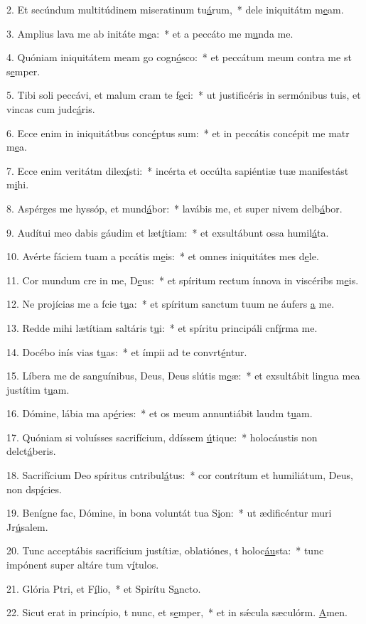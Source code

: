 2. Et secúndum multitúdinem miseratinum tu\uline{á}rum,~* dele iniquitátm m\uline{e}am.\par 
3. Amplius lava me ab initáte m\uline{e}a:~* et a peccáto me m\uline{u}nda me.\par 
4. Quóniam iniquitátem meam go cogn\uline{ó}sco:~* et peccátum meum contra me st s\uline{e}mper.\par 
5. Tibi soli peccávi, et malum cram te f\uline{e}ci:~* ut justificéris in sermónibus tuis, et vincas cum judc\uline{á}ris.\par 
6. Ecce enim in iniquitátbus conc\uline{é}ptus sum:~* et in peccátis concépit me matr m\uline{e}a.\par 
7. Ecce enim veritátm dilex\uline{í}sti:~* incérta et occúlta sapiéntiæ tuæ manifestást m\uline{i}hi.\par 
8. Aspérges me hyssóp, et mund\uline{á}bor:~* lavábis me, et super nivem delb\uline{á}bor.\par 
9. Audítui meo dabis gáudim et læt\uline{í}tiam:~* et exsultábunt ossa humil\uline{á}ta.\par 
10. Avérte fáciem tuam a pccátis m\uline{e}is:~* et omnes iniquitátes mes d\uline{e}le.\par 
11. Cor mundum cre in me, D\uline{e}us:~* et spíritum rectum ínnova in viscéribs m\uline{e}is.\par 
12. Ne projícias me a fcie t\uline{u}a:~* et spíritum sanctum tuum ne áufers \uline{a} me.\par 
13. Redde mihi lætítiam saltáris t\uline{u}i:~* et spíritu principáli cnf\uline{í}rma me.\par 
14. Docébo inís vias t\uline{u}as:~* et ímpii ad te convrt\uline{é}ntur.\par 
15. Líbera me de sanguínibus, Deus, Deus slútis m\uline{e}æ:~* et exsultábit lingua mea justítim t\uline{u}am.\par 
16. Dómine, lábia ma ap\uline{é}ries:~* et os meum annuntiábit laudm t\uline{u}am.\par 
17. Quóniam si voluísses sacrifícium, ddíssem \uline{ú}tique:~* holocáustis non delct\uline{á}beris.\par 
18. Sacrifícium Deo spíritus cntribul\uline{á}tus:~* cor contrítum et humiliátum, Deus, non dsp\uline{í}cies.\par 
19. Benígne fac, Dómine, in bona voluntát tua S\uline{i}on:~* ut ædificéntur muri Jr\uline{ú}salem.\par 
20. Tunc acceptábis sacrifícium justítiæ, oblatiónes, t holoc\uline{áu}sta:~* tunc impónent super altáre tum v\uline{í}tulos.\par 
21. Glória Ptri, et F\uline{í}lio,~* et Spirítu S\uline{a}ncto.\par 
22. Sicut erat in princípio, t nunc, et s\uline{e}mper,~* et in sǽcula sæculórm. \uline{A}men.\par 
